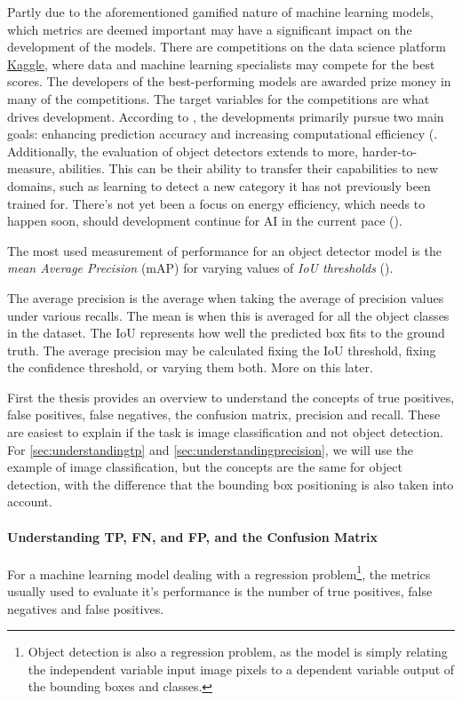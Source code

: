 Partly due to the aforementioned gamified nature of machine learning models, which metrics are deemed important may have a significant impact on the development of the models. There are competitions on the data science platform \href{https://kaggle.com}{Kaggle}, where data and machine learning specialists may compete for the best scores. The developers of the best-performing models are awarded prize money in many of the competitions. The target variables for the competitions are what drives development. According to \citeauthor{zou2023object_detection_in_20_years}, the developments primarily pursue two main goals: enhancing prediction accuracy and increasing computational efficiency (\citeyear{zou2023object_detection_in_20_years}. Additionally, the evaluation of object detectors extends to more, harder-to-measure, abilities. This can be their ability to transfer their capabilities to new domains, such as learning to detect a new category it has not previously been trained for. There's not yet been a focus on energy efficiency, which needs to happen soon, should development continue for AI in the current pace (\cite{lu2023AIenergyefficieny}).

The most used measurement of performance for an object detector model is the \textit{mean Average Precision} (mAP) for varying values of \textit{IoU thresholds} (\cite{zou2023object_detection_in_20_years}).

The average precision is the average when taking the average of precision values under various recalls. The mean is when this is averaged for all the object classes in the dataset. The IoU represents how well the predicted box fits to the ground truth. The average precision may be calculated fixing the IoU threshold, fixing the confidence threshold, or varying them both. More on this later.

First the thesis provides an overview to understand the concepts of true positives, false positives, false negatives, the confusion matrix, precision and recall. These are easiest to explain if the task is image classification and not object detection. For \ref{sec:understandingtp} and \ref{sec:understandingprecision}, we will use the example of image classification, but the concepts are the same for object detection, with the difference that the bounding box positioning is also taken into account.

\paragraph{Understanding TP, FN, and FP, and the Confusion Matrix}
\label{sec:understandingtp}
For a machine learning model dealing with a regression problem\footnote{Object detection is also a regression problem, as the model is simply relating the independent variable input image pixels to a dependent variable output of the bounding boxes and classes.}, the metrics usually used to evaluate it's performance is the number of true positives, false negatives and false positives.

